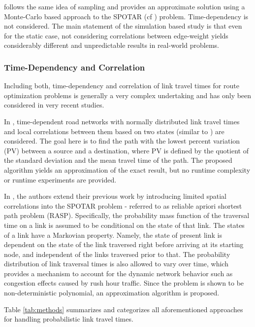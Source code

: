 \cite{Zockaei13} follows the same idea of sampling and provides an
approximate solution using a Monte-Carlo based approach to the SPOTAR (cf
\cite{Nie09b}) problem. Time-dependency is not considered. The main
statement of the simulation based study is that even for the static case, not
considering correlations between edge-weight yields considerably different and unpredictable
results in real-world problems.

\subsubsection{Time-Dependency and Correlation}
Including both, time-dependency and correlation of link travel times for route
optimization problems is generally a very complex undertaking and has only been
considered in very recent studies.

In \cite{Dong12}, time-dependent road networks with normally distributed
link travel times and local correlations between them based on two states
(similar to \cite{Nie06}) are considered. The goal here is to find the path
with the lowest percent variation (PV) between a source and a destination, where
PV is defined by the quotient of the standard deviation and the mean travel time of
the path. The proposed algorithm yields an approximation of the exact result,
but no runtime complexity or runtime experiments are provided.

In \cite{Nie09a}, the authors extend their previous work \cite{Nie09b} by
introducing limited spatial correlations into the SPOTAR problem - referred to
as reliable apriori shortest path problem (RASP). Specifically, the probability mass function of the traversal time on a link is assumed to be
conditional on the state of that link. The states of a link have a Markovian
property. Namely, the state of present link is dependent on the state of the
link traversed right before arriving at its starting node, and independent of
the links traversed prior to that. The probability distribution of link
traversal times is also allowed to vary over time, which provides a mechanism to
account for the dynamic network behavior such as congestion effects caused by
rush hour traffic. Since the problem is shown to be non-deterministic
polynomial, an approximation algorithm is proposed.

Table \ref{tab:methods} summarizes and categorizes all aforementioned approaches
for handling probabilistic link travel times.

